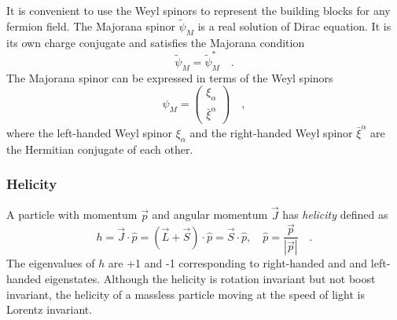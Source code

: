 %
It is convenient to use the Weyl spinors to represent the building blocks for any fermion field.
The Majorana spinor $\tilde{\psi}_{M}$ is a real solution of Dirac equation.
It is its own charge conjugate and satisfies the Majorana condition
%
\begin{equation}
    \tilde{\psi}_{M} = \tilde{\psi}_{M}^{*} \quad .
    \label{eq:susy_majorana_condition}
\end{equation}
%
The Majorana spinor can be expressed in terms of the Weyl spinors
%
\begin{equation}
    \psi_{M} = \left(\begin{matrix}\xi_{\alpha}\\\bar{\xi}^{\dot{\alpha}}\end{matrix}\right) \quad,
    \label{eq:susy_majorana_spinor}
\end{equation}
%
where the left-handed Weyl spinor $\xi_{\alpha}$ and the right-handed Weyl spinor $\bar{\xi}^{\dot{\alpha}}$ are the Hermitian conjugate of each other.


\subsubsection{Helicity}
\label{subsubsec:susy_helicity}
A particle with momentum $\vec{p}$ and angular momentum $\vec{J}$ has \textit{helicity} defined as
%
\begin{equation}
    h = \vec{J} \cdot \hat{p} = (\vec{L} + \vec{S}) \cdot \hat{p} = \vec{S} \cdot \hat{p}, \quad \hat{p} = \frac{\vec{p}}{|\vec{p}|} \quad .
    \label{eq:susy_helicity}
\end{equation}
%
The eigenvalues of $h$ are +1 and -1 corresponding to right-handed and and left-handed eigenstates.
Although the helicity is rotation invariant but not boost invariant, the helicity of a massless particle moving at the speed of light is Lorentz invariant.


